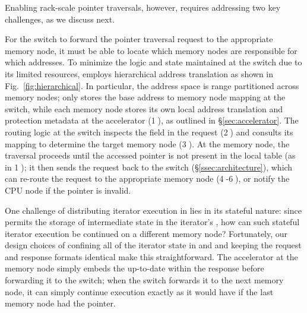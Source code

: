 Enabling rack-scale pointer traversals, however, requires addressing two key challenges, as we discuss next.

 For the switch to forward the pointer traversal request to the appropriate memory node, it must be able to locate which memory nodes are responsible for which addresses. To minimize the logic and state maintained at the switch due to its limited resources, \name employs hierarchical address translation as shown in Fig.~\ref{fig:hierarchical}. 
In particular, the address space is range partitioned across memory nodes; \name only stores the base address to memory node mapping at the switch, while each memory node stores its own local address translation and protection metadata at the accelerator (\textcircled{1}), as outlined in \S\ref{sec:accelerator}. The routing logic at the switch inspects the  field in the request (\textcircled{2}) and consults its mapping to determine the target memory node (\textcircled{3}). At the memory node, the traversal proceeds until the accessed pointer is not present in the local table (as in \textcircled{1}); it then sends the request back to the switch (\S\ref{ssec:architecture}), which can re-route the request to the appropriate memory node (\textcircled{4}-\textcircled{6}), or notify the CPU node if the pointer is invalid.

 One challenge of distributing iterator execution in \name lies in its stateful nature: since \name permits the storage of intermediate state in the iterator's , how can such stateful iterator execution be continued on a different memory node? Fortunately, our design choices of confining all of the iterator state in  and  and keeping the request and response formats identical make this straightforward. The accelerator at the memory node simply embeds the up-to-date  within the response before forwarding it to the switch; when the switch forwards it to the next memory node, it can simply continue execution exactly as it would have if the last memory node had the pointer. 




